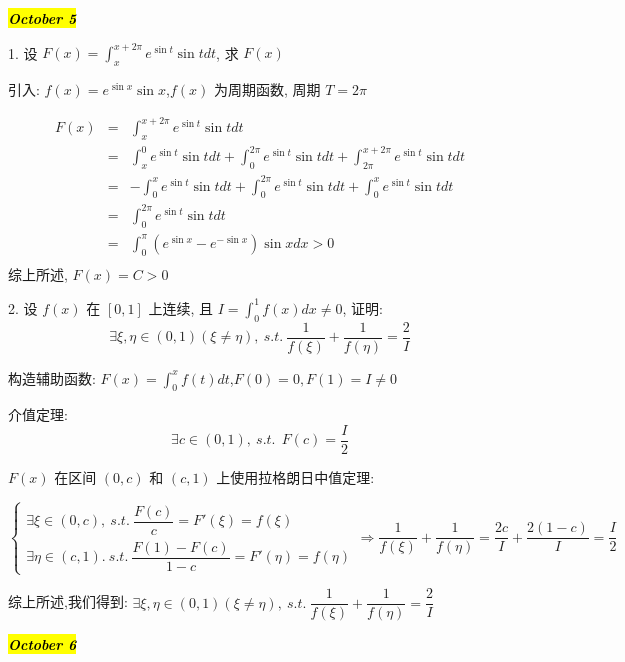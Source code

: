 \hl{\textbf{\textit{October 5}}}

1. 设 $\displaystyle{F(x)=\int_{x}^{x+2\pi}e^{\sin t}\sin tdt}$, 求 $F(x)$
\begin{solution}

	引入: $f(x)=e^{\sin x}\sin x$,$f(x)$ 为周期函数, 周期 $T = 2\pi$

	\begin{eqnarray*}
		F(x) & = & \int_{x}^{x+2\pi}e^{\sin t}\sin tdt\\
		     & = & \int_{x}^{0}e^{\sin t}\sin tdt + \int_{0}^{2\pi}e^{\sin t}\sin tdt + \int_{2\pi}^{x+2\pi}e^{\sin t}\sin tdt\\
		     & = & -\int_{0}^{x}e^{\sin t}\sin tdt + \int_{0}^{2\pi}e^{\sin t}\sin tdt + \int_{0}^{x}e^{\sin t}\sin tdt\\
		     & = & \int_{0}^{2\pi}e^{\sin t}\sin tdt\\
		     & = & \int_{0}^{\pi}(e^{\sin x}-e^{-\sin x})\sin xdx>0\\
	\end{eqnarray*}
	综上所述, $F(x)=C>0$
\end{solution}

2. 设 $f(x)$ 在 $[0,1]$ 上连续, 且 $\displaystyle{I=\int_{0}^{1}f(x)dx\neq 0}$, 证明:
$$\exists \xi,\eta\in(0,1)(\xi\neq \eta),\ s.t.\ \dfrac{1}{f(\xi)}+\dfrac{1}{f(\eta)}=\dfrac{2}{I}$$
\begin{solution}

	构造辅助函数: $\displaystyle{F(x)=\int_{0}^{x}f(t)dt}$,$F(0)=0,F(1)=I\neq 0$
	
	介值定理:  
	$$\exists c\in(0,1),\ s.t.\ \ F(c)=\dfrac{I}{2}$$
	
	$F(x)$ 在区间 $(0,c)$ 和 $(c,1)$ 上使用拉格朗日中值定理:  
	
	$$\begin{cases}
		\exists \xi  \in (0,c),\ s.t.\  \dfrac{F(c)}{c} = F'(\xi) = f(\xi) \\
		\exists \eta \in (c,1).\ s.t.\  \dfrac{F(1)-F(c)}{1-c} = F'(\eta) = f(\eta)
	\end{cases} \Rightarrow 
	\dfrac{1}{f(\xi)} + \dfrac{1}{f(\eta)} = \dfrac{2c}{I} + \dfrac{2(1-c)}{I} = \dfrac{I}{2}$$
	
	综上所述,我们得到: $\exists \xi,\eta\in(0,1)(\xi\neq \eta),\ s.t.\ \dfrac{1}{f(\xi)}+\dfrac{1}{f(\eta)}=\dfrac{2}{I}$
\end{solution}

\hl{\textbf{\textit{October 6}}}

